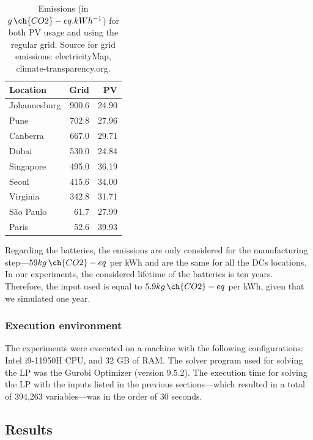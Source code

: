 \begin{table}

  \caption{Emissions (in $g\,\ch{CO2}-eq.kWh^{-1}$) for both PV usage and using the regular grid. Source for grid emissions: electricityMap, climate-transparency.org.}\label{tab:carbonfootprint} \centering
  \begin{tabular}{|l|r|r|}
    
  \hline
    
  \textbf{Location} &  \textbf{Grid} & \textbf{PV} \\
  \hline
  Johannesburg & 900.6 & 24.90 \\
  \hline
  Pune & 702.8 & 27.96 \\
  \hline
  Canberra & 667.0 & 29.71 \\
  \hline
  Dubai & 530.0  & 24.84 \\
  \hline
  Singapore & 495.0 & 36.19 \\
  \hline     
  Seoul & 415.6 & 34.00 \\
  \hline
  Virginia  & 342.8 & 31.71 \\
  \hline
  São Paulo &  61.7 & 27.99\\
  \hline 
  Paris &  52.6  & 39.93 \\
  \hline  

\end{tabular}  
\end{table}

Regarding the batteries, the emissions are only considered for the manufacturing step---$59 kg\,\ch{CO2}-eq$ per kWh and are the same for all the DCs locations. In our experiments, the considered lifetime of the batteries is ten years. Therefore, the input used is equal to $5.9 kg\,\ch{CO2}-eq$ per kWh, given that we simulated one year.

\subsubsection{Execution environment}
 
The experiments were executed on a machine with the following configurations: Intel i9-11950H CPU, and 32 GB of RAM. The solver program used for solving the LP was the Gurobi Optimizer (version 9.5.2). The execution time for solving the LP with the inputs listed in the previous sections---which resulted in a total of 394,263 variables---was in the order of 30 seconds.

\subsection{Results}

